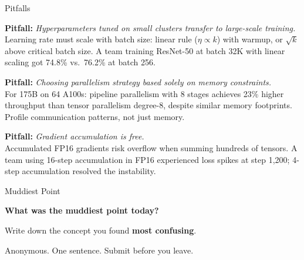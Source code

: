 \documentclass[aspectratio=169, 12pt]{beamer}
\begin{document}
\begin{frame}{Pitfalls}

\footnotesize
\textbf{Pitfall:} \textit{Hyperparameters tuned on small clusters transfer to large-scale training.}\\
Learning rate must scale with batch size: linear rule ($\eta \propto k$) with warmup, or $\sqrt{k}$ above critical batch size. A team training ResNet-50 at batch 32K with linear scaling got 74.8\% vs.\ 76.2\% at batch 256.

\vspace{0.12cm}
\textbf{Pitfall:} \textit{Choosing parallelism strategy based solely on memory constraints.}\\
For 175B on 64 A100s: pipeline parallelism with 8 stages achieves 23\% higher throughput than tensor parallelism degree-8, despite similar memory footprints. Profile communication patterns, not just memory.

\vspace{0.12cm}
\textbf{Pitfall:} \textit{Gradient accumulation is free.}\\
Accumulated FP16 gradients risk overflow when summing hundreds of tensors. A team using 16-step accumulation in FP16 experienced loss spikes at step 1,200; 4-step accumulation resolved the instability.

\end{frame}


\begin{frame}{Muddiest Point}
\note{
}

\centering
\vspace{1.0cm}
{\Large\bfseries What was the \alert{muddiest point} today?}

\vspace{0.8cm}
{\normalsize Write down the concept you found \textbf{most confusing}.}

\vspace{0.5cm}
{\small\textcolor{midgray}{Anonymous. One sentence. Submit before you leave.}}

\end{frame}
\end{document}
